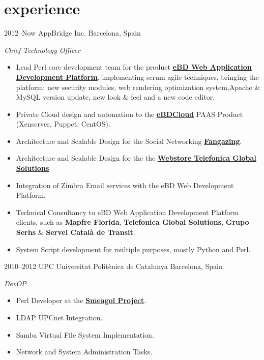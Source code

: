 \documentclass[]{friggeri-cv} %
\begin{document}
\section{experience}
\begin{entrylist}

\entry
{2012--Now}
{AppBridge Inc.}
{Barcelona, Spain}
{\emph{Chief Technology Officer} \\
\begin{itemize}
\item Lead Perl core development team for the product \href{http://www.ebdsoft.com}{\textbf{eBD Web Application Development Platform}}, implementing scrum agile techniques, bringing the platform: new security modules, web rendering optimization system,Apache \& MySQL version update, new look \& feel and a new code editor.
\item Private Cloud design and automation to the  \href{http://www.ebdcloud.com}{\textbf{eBDCloud}} PAAS Product (Xenserver, Puppet, CentOS).
\item Architecture and Scalable Design for the Social Networking \href{http://www.fangazing.com/berto}{\textbf{Fangazing}}.
\item Architecture and Scalable Design for the the \href{https://webstore.telefonicaglobalsolutions.com}{\textbf{Webstore Telefonica Global Solutions}}
\item Integration of Zimbra Email services with the eBD Web Development Platform.
\item Technical Consultancy to eBD Web Application Development Platform clients, such as \textbf{Mapfre Florida}, \textbf{Telefonica Global Solutions}, \textbf{Grupo Serhs} \& \textbf{Servei Català de Transit}.
\item System Script development for multiple purposes, mostly Python and Perl.   
\end{itemize}}
\pagebreak
\entry
{2010--2012}
{UPC Universitat Politènica de Catalunya}
{Barcelona, Spain}
{\emph{DevOP} \\
\begin{itemize}
\item Perl Developer at the \href{https://github.com/smeagol-upc/smeagol-perl}{\textbf{Smeagol Project}}.
\item LDAP UPCnet Integration.
\item Samba Virtual File System Implementation.
\item Network and System Administration Tasks.

\end{itemize}}
\end{entrylist}
\end{document}
